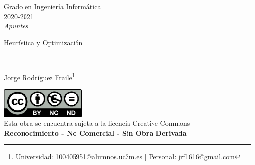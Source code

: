 \documentclass[12pt, twoside, openright]{report} %
\begin{document}
	
\begin{titlepage}
	\begin{sffamily}
	\color{azulUC3M}
	\begin{center}
		\begin{figure}[H] %
		\end{figure}
		\vspace{2.5cm}
		\begin{Large}
			Grado en Ingeniería Informática\\			
			2020-2021\\
			\vspace{2cm}		
			\textsl{Apuntes}\\
			\bigskip
		\end{Large}
		 	{\Huge Heurística y Optimización}\\
		 	\vspace*{0.5cm}
	 		\rule{10.5cm}{0.1mm}\\
			\vspace*{0.9cm}
			{\LARGE Jorge Rodríguez Fraile\footnote{\href{mailto:100405951@alumnos.uc3m.es}{Universidad: 100405951@alumnos.uc3m.es}  |  \href{mailto:jrf1616@gmail.com}{Personal: jrf1616@gmail.com}}}\\ 
			\vspace*{1cm}
	\end{center}
	\vfill
	\color{black}
		\includegraphics[width=4.2cm]{img/creativecommons.png}\\
		Esta obra se encuentra sujeta a la licencia Creative Commons\\ \textbf{Reconocimiento - No Comercial - Sin Obra Derivada}
	\end{sffamily}
\end{titlepage}


\tableofcontents
\thispagestyle{fancy}
\end{document}
